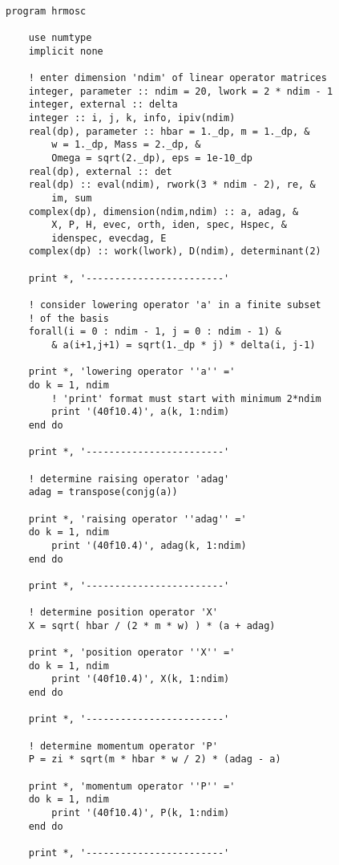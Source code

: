 \documentclass[12pt]{article}
\begin{document}
\begin{lstlisting}[frame=single,caption={{\tt Fortran 90} Code {\tt hrmosc.f90}},label=hrmosc]

program hrmosc

    use numtype
    implicit none

    ! enter dimension 'ndim' of linear operator matrices 
    integer, parameter :: ndim = 20, lwork = 2 * ndim - 1 
    integer, external :: delta
    integer :: i, j, k, info, ipiv(ndim)
    real(dp), parameter :: hbar = 1._dp, m = 1._dp, & 
        w = 1._dp, Mass = 2._dp, & 
        Omega = sqrt(2._dp), eps = 1e-10_dp 
    real(dp), external :: det
    real(dp) :: eval(ndim), rwork(3 * ndim - 2), re, &
        im, sum
    complex(dp), dimension(ndim,ndim) :: a, adag, &
        X, P, H, evec, orth, iden, spec, Hspec, &
        idenspec, evecdag, E
    complex(dp) :: work(lwork), D(ndim), determinant(2)

    print *, '------------------------'

    ! consider lowering operator 'a' in a finite subset
    ! of the basis
    forall(i = 0 : ndim - 1, j = 0 : ndim - 1) &
        & a(i+1,j+1) = sqrt(1._dp * j) * delta(i, j-1)

    print *, 'lowering operator ''a'' ='
    do k = 1, ndim
        ! 'print' format must start with minimum 2*ndim
        print '(40f10.4)', a(k, 1:ndim)
    end do

    print *, '------------------------'

    ! determine raising operator 'adag'
    adag = transpose(conjg(a))

    print *, 'raising operator ''adag'' ='
    do k = 1, ndim
        print '(40f10.4)', adag(k, 1:ndim)
    end do

    print *, '------------------------'

    ! determine position operator 'X'
    X = sqrt( hbar / (2 * m * w) ) * (a + adag)

    print *, 'position operator ''X'' ='
    do k = 1, ndim
        print '(40f10.4)', X(k, 1:ndim)
    end do

    print *, '------------------------'

    ! determine momentum operator 'P'
    P = zi * sqrt(m * hbar * w / 2) * (adag - a)

    print *, 'momentum operator ''P'' ='
    do k = 1, ndim
        print '(40f10.4)', P(k, 1:ndim)
    end do

    print *, '------------------------'


\end{lstlisting}
\end{document}
